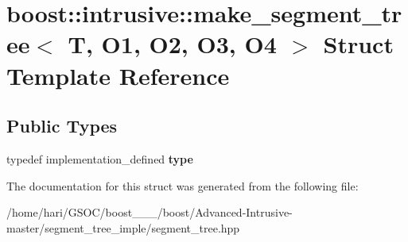 \hypertarget{structboost_1_1intrusive_1_1make__segment__tree}{}\section{boost\+:\+:intrusive\+:\+:make\+\_\+segment\+\_\+tree$<$ T, O1, O2, O3, O4 $>$ Struct Template Reference}
\label{structboost_1_1intrusive_1_1make__segment__tree}
\subsection*{Public Types}
\begin{DoxyCompactItemize}
\item 
\mbox{\label{structboost_1_1intrusive_1_1make__segment__tree_ac52c74ebd4a40dc2d3f2a37145bfe469}} 
typedef implementation\+\_\+defined {\bfseries type}
\end{DoxyCompactItemize}


The documentation for this struct was generated from the following file\+:\begin{DoxyCompactItemize}
\item 
/home/hari/\+G\+S\+O\+C/boost\+\_\+\_\+\_/boost/\+Advanced-\/\+Intrusive-\/master/segment\+\_\+tree\+\_\+imple/segment\+\_\+tree.\+hpp\end{DoxyCompactItemize}
